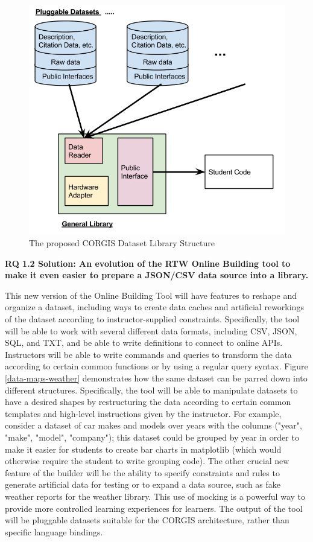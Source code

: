     
\begin{figure}
    \begin{center}
    	\includegraphics[width=.5\linewidth]{images/corgisDatasetArchitecture.png}
    \end{center}
    \caption{The proposed CORGIS Dataset Library Structure}
    \label{fig-corgis-architecture}
\end{figure}
    
    \textbf{RQ 1.2 Solution: An evolution of the RTW Online Building tool to make it even easier to prepare a JSON/CSV data source into a library.}
    
    This new version of the Online Building Tool will have features to reshape and organize a dataset, including ways to create data caches and artificial reworkings of the dataset according to instructor-supplied constraints.
    Specifically, the tool will be able to work with several different data formats, including CSV, JSON, SQL, and TXT, and be able to write definitions to connect to online APIs.
    Instructors will be able to write commands and queries to transform the data according to certain common functions or by using a regular query syntax.
    Figure \ref{data-maps-weather} demonstrates how the same dataset can be parred down into different structures.
    Specifically,  the tool will be able to manipulate datasets to have a desired shapes by restructuring the data according to certain common templates and high-level instructions given by the instructor.
    For example, consider a dataset of car makes and models over years with the columns ("year", "make", "model", "company"); this dataset could be grouped by year in order to make it easier for students to create bar charts in matplotlib (which would otherwise require the student to write grouping code).
    The other crucial new feature of the builder will be the ability to specify constraints and rules to generate artificial data for testing or to expand a data source, such as fake weather reports for the weather library.
    This use of mocking is a powerful way to provide more controlled learning experiences for learners.
    The output of the tool will be pluggable datasets suitable for the CORGIS architecture, rather than specific language bindings.
    
